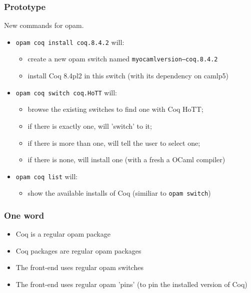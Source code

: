 \documentclass[9pt]{beamer}
\begin{document}
\begin{frame}
  \frametitle{Prototype}
  
  New commands for opam. 
  \begin{itemize}
  \item {\tt opam coq install coq.8.4.2} will:
    \begin{itemize}
    \item create a new opam switch named {\tt myocamlversion--coq.8.4.2}
    \item install Coq 8.4pl2 in this switch (with its dependency on camlp5)
    \end{itemize}
    \pause
  \item {\tt opam coq switch coq.HoTT} will:
    \begin{itemize}
    \item browse the existing switches to find one with Coq HoTT; 
      \pause
    \item if there is exactly one, will 'switch' to it;
    \item if there is more than one, will tell the user to select one;
    \item if there is none, will install one (with a fresh a OCaml compiler)
    \end{itemize}
    \pause
  \item {\tt opam coq list} will: 
    \begin{itemize}
    \item show the available installs of Coq (similiar to {\tt opam switch})
    \end{itemize}
  \end{itemize}
\end{frame}

\begin{frame}[fragile]
  \frametitle{One word}
  
  \begin{itemize}
  \item Coq is a \alert{regular} opam package
  \item Coq packages are \alert{regular} opam packages
  \item The front-end uses \alert{regular} opam switches
  \item The front-end uses \alert{regular} opam 'pins' (to pin the installed version of Coq)
  \end{itemize}
  
\end{frame}
\end{document}
